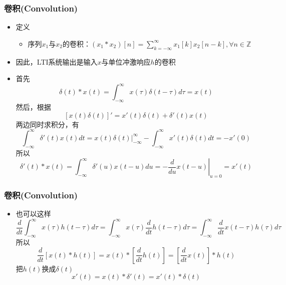 \documentclass[CJKutf8,dvipsnames,table]{beamer}
\newif\ifxetexorluatex %
\begin{document}
\begin{CJK*}{UTF8}{song}
  \begin{frame}
    \frametitle{卷积(Convolution)}
    \begin{itemize}
    \item 定义
        \begin{itemize}
        \item 序列$x_1$与$x_2$的卷积：$(x_1*x_2)[n]=\sum_{k=-\infty}^{\infty}x_1[k]x_2[n-k], \forall n \in \mathbb{Z}$
        \end{itemize}   
    \item 因此，LTI系统输出是输入$x$与单位冲激响应$h$的卷积
    \item 首先
    \[
    	\delta(t) \ast x(t) = \int_{-\infty}^{\infty} x(\tau) \delta(t - \tau)d\tau = x(t)
    \]
    然后，根据
    \[
    	[x(t)\delta(t)]' = x'(t)\delta(t) + \delta'(t)x(t) 
	\]
	两边同时求积分，有
	\[
    	\int_{-\infty}^{\infty} \delta'(t)x(t) dt = \left. x(t)\delta(t) \right\vert_{-\infty}^{\infty} - \int_{-\infty}^{\infty} x'(t)\delta(t) dt = -x'(0)
    \]
	所以	
    \[
		\delta'(t) \ast x(t) = \int_{-\infty}^{\infty} \delta'(u)x(t-u) du = -\left. \frac{d}{du}x(t-u) \right\vert_{u=0} = x'(t)
	\]
    \end{itemize} 
  \end{frame}  
     
  \begin{frame}
    \frametitle{卷积(Convolution)}
    \begin{itemize}
    \item 也可以这样
    \[
    	\frac{d}{dt} \int_{-\infty}^{\infty} x(\tau)h(t-\tau) d\tau =  \int_{-\infty}^{\infty} x(\tau) \frac{d}{dt} h(t-\tau) d\tau = \int_{-\infty}^{\infty} \frac{d}{dt} x(t-\tau) h(\tau) d\tau 
    \]
	所以	
    \[
		\frac{d}{dt} [x(t) \ast h(t)] = x(t) \ast [\frac{d}{dt}h(t)] = [\frac{d}{dt}x(t)] \ast h(t)
	\]
	把$h(t)$换成$\delta(t)$
	\[
		x'(t) = x(t) \ast \delta'(t) = x'(t) \ast \delta(t)	
	\]
    \end{itemize} 
  \end{frame}   
      
\ifxetexorluatex\else
\end{CJK*}
\fi
\end{document}
